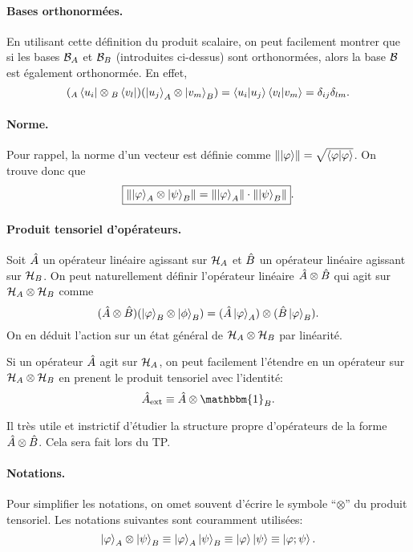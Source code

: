 \documentclass[11pt,a4paper,oneside]{article}
\begin{document}
\paragraph*{Bases orthonormées.} En utilisant cette définition du produit scalaire, on peut facilement montrer que si les bases $\mathcal{B}_A$ et $\mathcal{B}_B$ (introduites ci-dessus) sont orthonormées, alors la base $\mathcal{B}$ est également orthonormée. En effet,
\begin{equation}
    ({_A}\bra{u_i}\otimes{_B}\bra{v_l})(\ket{u_j}_A\otimes\ket{v_m}_B) = \braket{u_i}{u_j}\braket{v_l}{v_m} = \delta_{ij}\delta_{lm}.
\end{equation}

\paragraph*{Norme.} Pour rappel, la norme d'un vecteur est définie comme $\norm{\ket{\varphi}}=\sqrt{\braket{\varphi}}$. On trouve donc que
\begin{equation}
    \boxed{\norm{\ket{\varphi}_A\otimes\ket{\psi}_B} = \norm{\ket{\varphi}_A}\cdot\norm{\ket{\psi}_B}}.
\end{equation}

\paragraph*{Produit tensoriel d'opérateurs.} Soit $\hat{A}$ un opérateur linéaire agissant sur $\mathcal{H}_A$ et $\hat{B}$ un opérateur linéaire agissant sur $\mathcal{H}_B$. On peut naturellement définir l'opérateur linéaire $\hat{A}\otimes\hat{B}$ qui agit sur $\mathcal{H}_A\otimes\mathcal{H}_B$ comme 
\begin{equation}
    (\hat{A}\otimes\hat{B})(\ket{\varphi}_B\otimes\ket{\phi}_B) = (\hat{A}\ket{\varphi}_A)\otimes(\hat{B}\ket{\varphi}_B).
\end{equation}
On en déduit l'action sur un état général de $\mathcal{H}_A\otimes\mathcal{H}_B$ par linéarité.

Si un opérateur $\hat{A}$ agit sur $\mathcal{H}_A$, on peut facilement l'étendre en un opérateur sur $\mathcal{H}_A\otimes\mathcal{H}_B$ en prenent le produit tensoriel avec l'identité:
\begin{equation}
    \hA_{\text{ext}} \equiv \hA\otimes\mathbbm{1}_B.
\end{equation}

Il très utile et instrictif d'étudier la structure propre d'opérateurs de la forme $\hat{A}\otimes\hat{B}$. Cela sera fait lors du TP.

\paragraph*{Notations.} Pour simplifier les notations, on omet souvent d'écrire le symbole ``$\otimes$'' du produit tensoriel. Les notations suivantes sont couramment utilisées:
\begin{equation}
    \ket{\varphi}_A\otimes\ket{\psi}_B \equiv \ket{\varphi}_A\ket{\psi}_B \equiv \ket{\varphi}\ket{\psi} \equiv \ket{\varphi;\psi}.
\end{equation}
\end{document}
